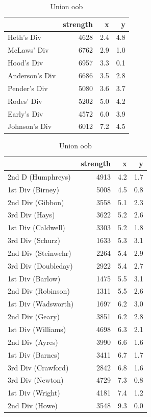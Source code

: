 \documentclass{article}
\begin{document}
\begin{table}
\parbox{.45\linewidth}{
\begin{tabular}{lrrr}
\toprule
{} &  strength &    x &    y \\
\midrule
Heth's Div     &      4628 &  2.4 &  4.8 \\
McLaws' Div    &      6762 &  2.9 &  1.0 \\
Hood's Div     &      6957 &  3.3 &  0.1 \\
Anderson's Div &      6686 &  3.5 &  2.8 \\
Pender's Div   &      5080 &  3.6 &  3.7 \\
Rodes' Div     &      5202 &  5.0 &  4.2 \\
Early's Div    &      4572 &  6.0 &  3.9 \\
Johnson's Div  &      6012 &  7.2 &  4.5 \\
\bottomrule
\end{tabular}
\caption{Confederate oob}
\label{tab:Confederate}
}
\hfill
\parbox{.45\linewidth}{
\begin{tabular}{lrrr}
\toprule
{} &  strength &    x &    y \\
\midrule
2nd D (Humphreys)   &      4913 &  4.2 &  1.7 \\
1st Div (Birney)    &      5008 &  4.5 &  0.8 \\
2nd Div (Gibbon)    &      3558 &  5.1 &  2.3 \\
3rd Div (Hays)      &      3622 &  5.2 &  2.6 \\
1st Div (Caldwell)  &      3303 &  5.2 &  1.8 \\
3rd Div (Schurz)    &      1633 &  5.3 &  3.1 \\
2nd Div (Steinwehr) &      2264 &  5.4 &  2.9 \\
3rd Div (Doubleday) &      2922 &  5.4 &  2.7 \\
1st Div (Barlow)    &      1475 &  5.5 &  3.1 \\
2nd Div (Robinson)  &      1311 &  5.5 &  2.6 \\
1st Div (Wadsworth) &      1697 &  6.2 &  3.0 \\
2nd Div (Geary)     &      3851 &  6.2 &  2.8 \\
1st Div (Williams)  &      4698 &  6.3 &  2.1 \\
2nd Div (Ayres)     &      3990 &  6.6 &  1.6 \\
1st Div (Barnes)    &      3411 &  6.7 &  1.7 \\
3rd Div (Crawford)  &      2842 &  6.8 &  1.6 \\
3rd Div (Newton)    &      4729 &  7.3 &  0.8 \\
1st Div (Wright)    &      4181 &  7.4 &  1.2 \\
2nd Div (Howe)      &      3548 &  9.3 &  0.0 \\
\bottomrule
\end{tabular}
\caption{Union oob}
\label{tab:Union}
}
\end{table}
\end{document}
